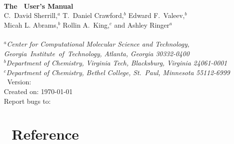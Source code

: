 \documentclass[12pt]{article}
\begin{document}


\begin{center}
\ \\
\vspace{2.0in}
{\bf {\Large The \PSIthree\ User's Manual}} \\
\vspace{0.5in}
C.~David Sherrill,$^a$ T.~Daniel Crawford,$^b$ Edward F.~Valeev,$^b$ \\
Micah L. Abrams,$^b$ Rollin A.~King,$^c$ and Ashley Ringer$^a$ \\
\ \\
{\em $^a$Center for Computational Molecular Science and Technology, 
  \mbox{Georgia Institute of Technology,} Atlanta, Georgia 30332-0400} \\
\vspace{0.1in}
{\em $^b$Department of Chemistry, Virginia Tech, Blacksburg, Virginia 
  24061-0001} \\
\vspace{0.1in}
{\em $^c$Department of Chemistry, Bethel College, St.\ Paul, Minnesota 
  55112-6999}
\ \\
\vspace{0.3in}
\PSIthree\ Version: \PSIversion \\
Created on: \today \\
Report bugs to: \PSIemail \\
\end{center}

\thispagestyle{empty}

\newpage
\tableofcontents
\newpage





  
  
  
  
  




\appendix
\section{\PSIthree\ Reference}\label{PSI_Reference}



%



\end{document}

